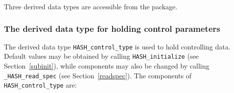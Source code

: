 \documentclass{galahad}
\newcommand{\packagename}{HASH}
\newcommand{\fullpackagename}{\libraryname\_\packagename}
\begin{document}

\galtypes
Three derived data types are accessible from the package.


\subsubsection{The derived data type for holding control
 parameters}\label{typecontrol}
The derived data type
{\tt \packagename\_control\_type}
is used to hold controlling data. Default values may be obtained by calling
{\tt \packagename\_initialize}
(see Section~\ref{subinit}),
while components may also be changed by calling
{\tt \fullpackagename\_read\-\_spec}
(see Section~\ref{readspec}).
The components of
{\tt \packagename\_control\_type}
are:
\end{document}
